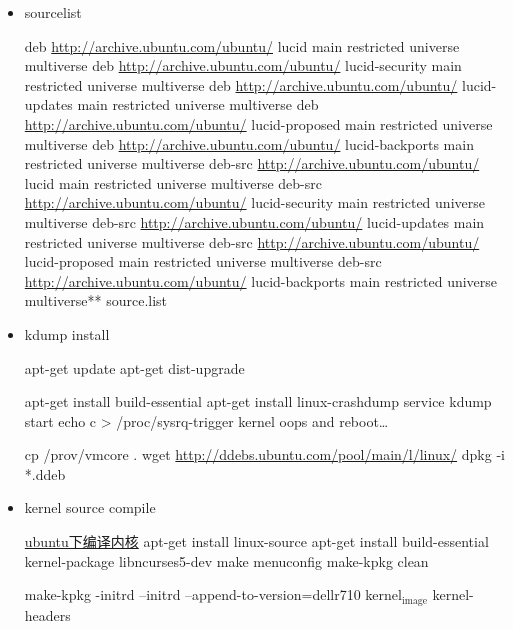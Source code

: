 \documentclass[11pt]{article}
\begin{document}
\begin{itemize}

\item sourcelist\\
\label{sec-1.4.1.1}

deb \href{http://archive.ubuntu.com/ubuntu/}{http://archive.ubuntu.com/ubuntu/} lucid main restricted universe multiverse
deb \href{http://archive.ubuntu.com/ubuntu/}{http://archive.ubuntu.com/ubuntu/} lucid-security main restricted universe multiverse
deb \href{http://archive.ubuntu.com/ubuntu/}{http://archive.ubuntu.com/ubuntu/} lucid-updates main restricted universe multiverse
deb \href{http://archive.ubuntu.com/ubuntu/}{http://archive.ubuntu.com/ubuntu/} lucid-proposed main restricted universe multiverse
deb \href{http://archive.ubuntu.com/ubuntu/}{http://archive.ubuntu.com/ubuntu/} lucid-backports main restricted universe multiverse
deb-src \href{http://archive.ubuntu.com/ubuntu/}{http://archive.ubuntu.com/ubuntu/} lucid main restricted universe multiverse
deb-src \href{http://archive.ubuntu.com/ubuntu/}{http://archive.ubuntu.com/ubuntu/} lucid-security main restricted universe multiverse
deb-src \href{http://archive.ubuntu.com/ubuntu/}{http://archive.ubuntu.com/ubuntu/} lucid-updates main restricted universe multiverse
deb-src \href{http://archive.ubuntu.com/ubuntu/}{http://archive.ubuntu.com/ubuntu/} lucid-proposed main restricted universe multiverse
deb-src \href{http://archive.ubuntu.com/ubuntu/}{http://archive.ubuntu.com/ubuntu/} lucid-backports main restricted universe multiverse**  source.list


\item kdump install\\
\label{sec-1.4.1.2}

apt-get update
apt-get dist-upgrade

apt-get  install  build-essential
apt-get install linux-crashdump
service kdump start
echo c > /proc/sysrq-trigger
kernel oops and reboot\ldots{}

cp /prov/vmcore  .
wget \href{http://ddebs.ubuntu.com/pool/main/l/linux/}{http://ddebs.ubuntu.com/pool/main/l/linux/}
dpkg -i *.ddeb


\item kernel source compile\\
\label{sec-1.4.1.3}

\href{http://blog.csdn.net/jsufcz/archive/2009/09/23/4582712.aspx}{ubuntu下编译内核}
apt-get install linux-source
apt-get install build-essential kernel-package   libncurses5-dev
make menuconfig
make-kpkg clean

make-kpkg -initrd --initrd --append-to-version=dellr710 kernel$_{\mathrm{image}}$ kernel-headers

\end{itemize} %
\end{document}
